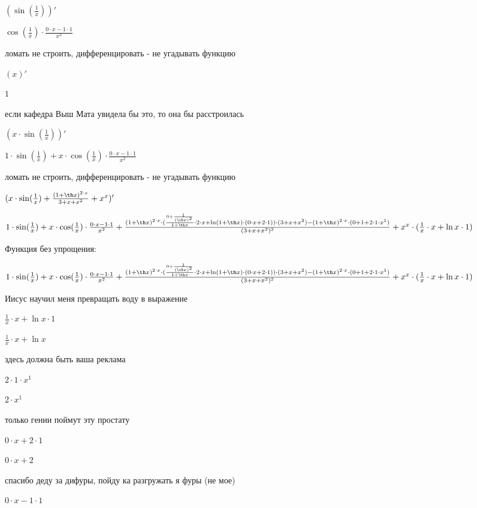 \documentclass[a4paper,12pt]{article}
\begin{document}
$( \sin ( \frac{1}{x} ))'$

$ \cos ( \frac{1}{x} ) \cdot  \frac{0 \cdot x-1 \cdot 1}{x^{2}} $

ломать не строить, дифференцировать - не угадывать функцию 

$(x)'$

$1$

если кафедра Выш Мата увидела бы это, то она бы расстроилась 

$(x \cdot  \sin ( \frac{1}{x} ))'$

$1 \cdot  \sin ( \frac{1}{x} )+x \cdot  \cos ( \frac{1}{x} ) \cdot  \frac{0 \cdot x-1 \cdot 1}{x^{2}} $

ломать не строить, дифференцировать - не угадывать функцию 

$(x \cdot  \sin ( \frac{1}{x} )+ \frac{(1+ \th x)^{2 \cdot x}}{3+x+x^{2}} +x^{x})'$

$1 \cdot  \sin ( \frac{1}{x} )+x \cdot  \cos ( \frac{1}{x} ) \cdot  \frac{0 \cdot x-1 \cdot 1}{x^{2}} + \frac{(1+ \th x)^{2 \cdot x} \cdot ( \frac{0+ \frac{1}{( \ch x)^{2}} }{1+ \th x}  \cdot 2 \cdot x+ \ln (1+ \th x) \cdot (0 \cdot x+2 \cdot 1)) \cdot (3+x+x^{2})-(1+ \th x)^{2 \cdot x} \cdot (0+1+2 \cdot 1 \cdot x^{1})}{(3+x+x^{2})^{2}} +x^{x} \cdot ( \frac{1}{x}  \cdot x+ \ln x \cdot 1)$

Функция без упрощения:

$1 \cdot  \sin ( \frac{1}{x} )+x \cdot  \cos ( \frac{1}{x} ) \cdot  \frac{0 \cdot x-1 \cdot 1}{x^{2}} + \frac{(1+ \th x)^{2 \cdot x} \cdot ( \frac{0+ \frac{1}{( \ch x)^{2}} }{1+ \th x}  \cdot 2 \cdot x+ \ln (1+ \th x) \cdot (0 \cdot x+2 \cdot 1)) \cdot (3+x+x^{2})-(1+ \th x)^{2 \cdot x} \cdot (0+1+2 \cdot 1 \cdot x^{1})}{(3+x+x^{2})^{2}} +x^{x} \cdot ( \frac{1}{x}  \cdot x+ \ln x \cdot 1)$

Иисус научил меня превращать воду в выражение 

$ \frac{1}{x}  \cdot x+ \ln x \cdot 1$

$ \frac{1}{x}  \cdot x+ \ln x$

здесь должна быть ваша реклама 

$2 \cdot 1 \cdot x^{1}$

$2 \cdot x^{1}$

только гении поймут эту простату 

$0 \cdot x+2 \cdot 1$

$0 \cdot x+2$

спасибо деду за дифуры, пойду ка разгружать я фуры (не мое) 

$0 \cdot x-1 \cdot 1$
\end{document}
